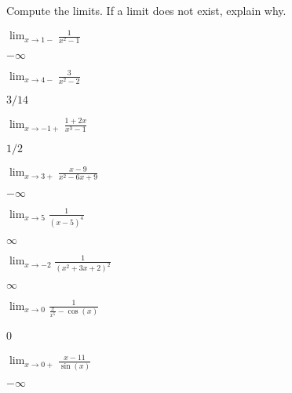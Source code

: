 \begin{exercises}

\noindent Compute the limits. If a limit does not exist, explain why.
\twocol
\begin{exercise}
$\lim_{x\to 1-} \frac{1}{x^2-1}$
\begin{answer}
  $-\infty$
\end{answer}
\end{exercise}

\begin{exercise}
$\lim_{x\to 4-} \frac{3}{x^2-2}$
\begin{answer}
  $3/14$
\end{answer}
\end{exercise}

\begin{exercise}
$\lim_{x\to -1+} \frac{1+2x}{x^3-1}$
\begin{answer}
  $1/2$
\end{answer}
\end{exercise}

\begin{exercise}
$\lim_{x\to 3+} \frac{x-9}{x^2-6x+9}$
\begin{answer}
  $-\infty$
\end{answer}
\end{exercise}

\begin{exercise}
$\lim_{x\to 5} \frac{1}{(x-5)^4}$
\begin{answer}
  $\infty$
\end{answer}
\end{exercise}


\begin{exercise}
$\lim_{x\to -2} \frac{1}{(x^2+3x+2)^2}$
\begin{answer}
  $\infty$
\end{answer}
\end{exercise}


\begin{exercise}
$\lim_{x\to 0} \frac{1}{\frac{x}{x^5}-\cos(x)}$
\begin{answer}
  0
\end{answer}
\end{exercise}

\begin{exercise}
$\lim_{x\to 0+} \frac{x-11}{\sin(x)}$
\begin{answer}
  $-\infty$
\end{answer}
\end{exercise}



\end{exercises}
